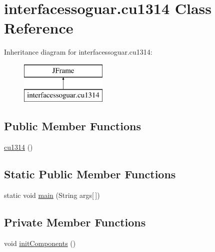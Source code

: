\hypertarget{classinterfacessoguar_1_1cu1314}{}\section{interfacessoguar.\+cu1314 Class Reference}
\label{classinterfacessoguar_1_1cu1314}
Inheritance diagram for interfacessoguar.\+cu1314\+:\begin{figure}[H]
\begin{center}
\leavevmode
\includegraphics[height=2.000000cm]{classinterfacessoguar_1_1cu1314}
\end{center}
\end{figure}
\subsection*{Public Member Functions}
\begin{DoxyCompactItemize}
\item 
\mbox{\hyperlink{classinterfacessoguar_1_1cu1314_a96829fa8e13831c1c9be1e7573fcc7da}{cu1314}} ()
\end{DoxyCompactItemize}
\subsection*{Static Public Member Functions}
\begin{DoxyCompactItemize}
\item 
static void \mbox{\hyperlink{classinterfacessoguar_1_1cu1314_a465bd6e52f03d22115cba1995f1b6902}{main}} (String args\mbox{[}$\,$\mbox{]})
\end{DoxyCompactItemize}
\subsection*{Private Member Functions}
\begin{DoxyCompactItemize}
\item 
void \mbox{\hyperlink{classinterfacessoguar_1_1cu1314_a8601e51a52b5a57003a1d122c904b4b9}{init\+Components}} ()
\end{DoxyCompactItemize}

